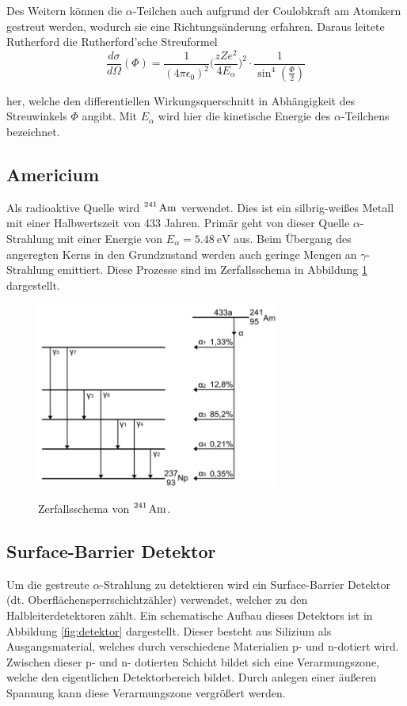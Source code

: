 Des Weitern können die $\alpha$-Teilchen auch aufgrund der Coulobkraft am Atomkern gestreut werden, wodurch sie eine
Richtungsänderung erfahren. Daraus leitete Rutherford die Rutherford'sche Streuformel
\begin{equation}
  \frac{d\sigma}{d\Omega}(\Phi)=\frac{1}{(4\pi \epsilon_0)^2}\Bigg(\frac{zZe^2}{4E_{\alpha}}\Bigg)^2
  \cdot\frac{1}{\sin^4{(\frac{\Phi}{2})}}
  \label{eqn:Rutherford}
\end{equation}

her, welche den differentiellen Wirkungsquerschnitt in Abhängigkeit des Streuwinkels $\Phi$ angibt. Mit $E_{\alpha}$
wird hier die kinetische Energie des $\alpha$-Teilchens bezeichnet.

\subsection{Americium}

Als radioaktive Quelle wird $\ce{^{241} Am}$ verwendet. Dies ist ein silbrig-weißes Metall mit einer
Halbwertszeit von 433 Jahren. Primär geht von dieser Quelle $\alpha$-Strahlung mit einer Energie von
$E_{\alpha}=\SI{5,48}{\eV}$ aus. Beim Übergang des angeregten Kerns in den Grundzustand werden auch geringe
Mengen an $\gamma$-Strahlung emittiert. Diese Prozesse sind im Zerfallsschema in Abbildung \ref{fig:Zerfall}
dargestellt.

\begin{figure}[H]
  \centering
  \includegraphics[width=8cm]{Zerfallsschema.png}
  \caption{Zerfallsschema von $\ce{^{241} Am}$. }
  \label{fig:Zerfall}
  \cite{zerfall}
\end{figure}

\subsection{Surface-Barrier Detektor}
Um die gestreute $\alpha$-Strahlung zu detektieren wird ein Surface-Barrier Detektor
(dt. Oberflächensperrschichtzähler) verwendet, welcher zu den Halbleiterdetektoren zählt.
Ein schematische Aufbau dieses Detektors ist in Abbildung \ref{fig:detektor} dargestellt.
Dieser besteht aus Silizium als Ausgangsmaterial, welches durch verschiedene Materialien
p- und n-dotiert wird. Zwischen dieser p- und n- dotierten Schicht bildet sich eine Verarmungszone,
welche den eigentlichen Detektorbereich bildet. Durch anlegen einer äußeren Spannung kann diese
Verarmungszone vergrößert werden.

